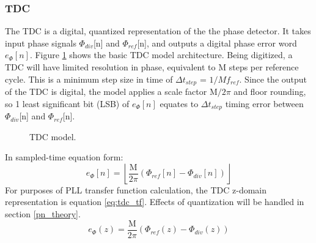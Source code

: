 	\subsubsection{TDC}
		The TDC is a digital, quantized representation of the the phase detector. It takes input phase signals $\Phi_{div}$[n] and $\Phi_{ref}$[n], and outputs a digital phase error word $e_\Phi[n]$. Figure \ref{fig:tdc} shows the basic TDC model architecture. Being digitized, a TDC will have limited resolution in phase, equivalent to M steps per reference cycle. This is a minimum step size in time of $\Delta t_{step}$ = $1/Mf_{ref}$. Since the output of the TDC is digital, the model applies a scale factor M$/2\pi$ and floor rounding, so 1 least significant bit (LSB) of $e_\Phi[n]$ equates to $\Delta t_{step}$ timing error  between $\Phi_{div}$[n] and $\Phi_{ref}$[n].
		\begin{figure}[htb!]
			\center
			\caption{TDC model.}
			\label{fig:tdc}
		\end{figure}
		\FloatBarrier
		In sampled-time equation form:
		\begin{equation}
			e_\Phi[n] = \left\lfloor\frac{\mathrm{M}}{2\pi}(\Phi_{ref}[n] - \Phi_{div}[n])\right\rfloor
		\end{equation}
		For purposes of PLL transfer function calculation, the TDC z-domain representation is equation \ref{eq:tdc_tf}. Effects of quantization will be handled in section \ref{pn_theory}.
		\begin{equation}\label{eq:tdc_tf}
			e_\Phi(z) = \frac{\mathrm{M}}{2\pi}(\Phi_{ref}(z) - \Phi_{div}(z))
		\end{equation}	
		\FloatBarrier

